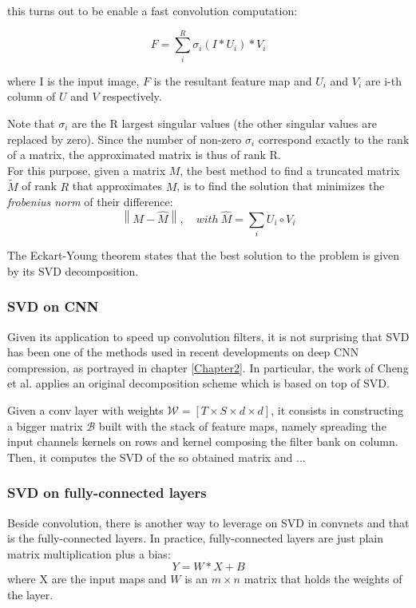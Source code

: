 this turns out to be enable a fast convolution computation: 

\begin{equation}
	F = \sum_{i}^{R} \sigma_i(I * U_i)*V_i  
\end{equation}

where I is the input image, $F$ is the resultant feature map and $U_i$ and $V_i$ are i-th column of $U$ and $V$ respectively. 

Note that $\sigma_i$ are the R largest singular values (the other singular values are replaced by zero). Since the number of non-zero $\sigma_i$ correspond exactly to the rank of a matrix, the approximated matrix is thus of rank R. \\
For this purpose, given a matrix $M$, the best method to find a truncated matrix $\tilde{M}$ of rank $R$ that approximates $M$, is to find the solution that minimizes the \emph{frobenius norm} of their difference:
\begin{equation}
\left \| M - \hat{M} \right \|, \quad with \ \hat{M} = \sum_i U_i \circ V_i
\end{equation}

The Eckart-Young theorem \parencite{Weckart} states that the best solution to the problem is given by its SVD decomposition. 

\subsubsection{SVD on CNN}
Given its application to speed up convolution filters, it is not surprising that SVD has been one of the methods used in recent developments on deep CNN compression, as portrayed in chapter \ref{Chapter2}.
In particular, the work of Cheng et al. \parencite{zhang2015SVD} applies an original decomposition scheme which is based on top of SVD. 

Given a conv layer with weights $\mathcal{W} = [T \times S \times d \times d]$, it consists in constructing a bigger matrix $\mathcal{B}$ built with the stack of feature maps, namely spreading the input channels kernels on rows and kernel composing the filter bank on column. Then, it computes the SVD of the so obtained matrix and ... 
 

\subsubsection{SVD on fully-connected layers}
\label{subsec:svd-fc}
Beside convolution, there is another way to leverage on SVD in convnets and that is the fully-connected layers. In practice, fully-connected layers are just plain matrix multiplication plus a bias:
\begin{equation}
\label{eq:fc}
Y = W*X+B 
\end{equation}
where X are the input maps and $W$ is an $m \times n$ matrix that holds the weights of the layer.  

